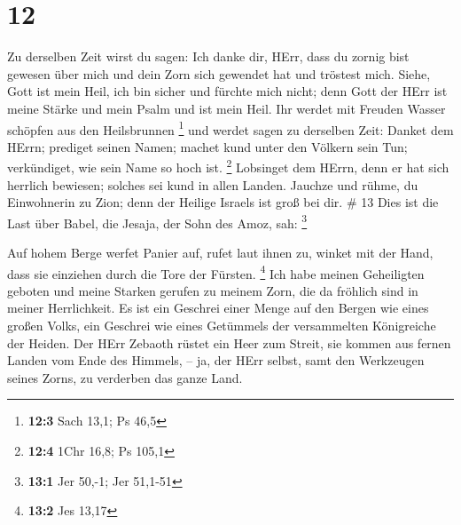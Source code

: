 \hypertarget{section-6}{%
\section{12}\label{section-6}}

 Zu derselben Zeit wirst du sagen: Ich danke dir, HErr, dass
du zornig bist gewesen über mich und dein Zorn sich gewendet hat und
tröstest mich.  Siehe, Gott ist mein Heil, ich bin sicher
und fürchte mich nicht; denn Gott der HErr ist meine Stärke und mein
Psalm und ist mein Heil.  Ihr werdet mit Freuden Wasser
schöpfen aus den Heilsbrunnen \footnote{\textbf{12:3} Sach 13,1; Ps 46,5}
 und werdet sagen zu derselben Zeit: Danket dem HErrn;
prediget seinen Namen; machet kund unter den Völkern sein Tun;
verkündiget, wie sein Name so hoch ist. \footnote{\textbf{12:4} 1Chr
  16,8; Ps 105,1}  Lobsinget dem HErrn, denn er hat sich
herrlich bewiesen; solches sei kund in allen Landen. 
Jauchze und rühme, du Einwohnerin zu Zion; denn der Heilige Israels ist
groß bei dir. \# 13  Dies ist die Last über Babel, die
Jesaja, der Sohn des Amoz, sah: \footnote{\textbf{13:1} Jer 50,-1; Jer
  51,1-51}

 Auf hohem Berge werfet Panier auf, rufet laut ihnen zu,
winket mit der Hand, dass sie einziehen durch die Tore der Fürsten.
\footnote{\textbf{13:2} Jes 13,17}  Ich habe meinen
Geheiligten geboten und meine Starken gerufen zu meinem Zorn, die da
fröhlich sind in meiner Herrlichkeit.  Es ist ein Geschrei
einer Menge auf den Bergen wie eines großen Volks, ein Geschrei wie
eines Getümmels der versammelten Königreiche der Heiden. Der HErr
Zebaoth rüstet ein Heer zum Streit,  sie kommen aus fernen
Landen vom Ende des Himmels, -- ja, der HErr selbst, samt den Werkzeugen
seines Zorns, zu verderben das ganze Land.

